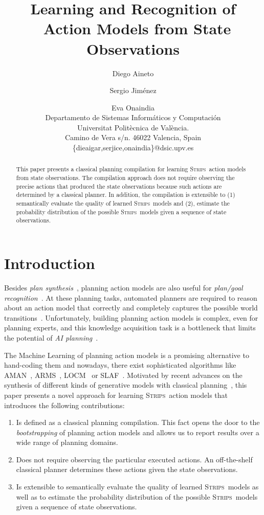 \documentclass{article}
\title{Learning and Recognition of \strips\ Action Models from State Observations}
\author{Diego Aineto\and Sergio Jim\'enez\and Eva Onaindia\\
{\small Departamento de Sistemas Inform\'aticos y Computaci\'on}\\
{\small Universitat Polit\`ecnica de Val\`encia.}\\
{\small Camino de Vera s/n. 46022 Valencia, Spain}\\
{\small \{dieaigar,serjice,onaindia\}@dsic.upv.es}}
\newcommand{\strips}{\textsc{Strips}}     %
\begin{document}
\maketitle

\begin{abstract}
This paper presents a classical planning compilation for learning \strips\ action models from state observations. The compilation approach does not require observing the precise actions that produced the state observations because such actions are determined by a classical planner. In addition, the compilation is extensible to (1) semantically evaluate the quality of learned \strips\ models and (2), estimate the probability distribution of the possible \strips\ models given a sequence of state observations.  
\end{abstract}

\section{Introduction}
Besides {\em plan synthesis}~\cite{ghallab2004automated}, planning action models are also useful for {\em plan/goal recognition}~\cite{ramirez2012plan}. At these planning tasks, automated planners are required to reason about an action model that correctly and completely captures the possible world transitions~\cite{geffner:book:2013}. Unfortunately, building planning action models is complex, even for planning experts, and this knowledge acquisition task is a bottleneck that limits the potential of {\em AI planning}~\cite{kambhampati:modellite:AAAI2007}.

The Machine Learning of planning action models is a promising alternative to hand-coding them and nowadays, there exist sophisticated algorithms like {\sc AMAN}~\cite{zhuo2013action}, {\sc ARMS}~\cite{yang2007learning}, {\sc LOCM}~\cite{cresswell2013acquiring} or {\sc SLAF}~\cite{amir:alearning:JAIR08}. Motivated by recent advances on the synthesis of different kinds of generative models with classical planning~\cite{bonet2009automatic,segovia2016hierarchical,segovia2017generating}, this paper presents a novel approach for learning \strips\ action models that introduces the following contributions:
\begin{enumerate}
\item Is defined as a classical planning compilation. This fact opens the door to the {\em bootstrapping} of planning action models and allows us to report results over a wide range of planning domains. 
\item Does not require observing the particular executed actions. An off-the-shelf classical planner determines these actions given the state observations.
\item Is extensible to semantically evaluate the quality of learned \strips\ models as well as to estimate the probability distribution of the possible \strips\ models given a sequence of state observations. 
\end{enumerate}
 
\end{document}
